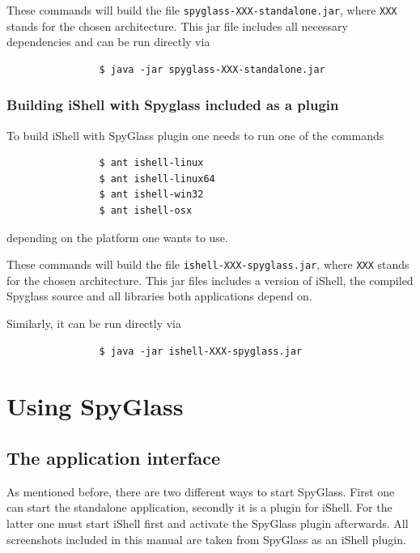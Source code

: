 			These commands will build the file \texttt{spyglass-XXX-standalone.jar}, where
			\texttt{XXX} stands for the chosen architecture.
			This jar file includes all necessary dependencies and can be run directly via

			\begin{verbatim}
			    $ java -jar spyglass-XXX-standalone.jar
			\end{verbatim}

		\subsubsection{Building iShell with Spyglass included as a plugin}

			To build iShell with SpyGlass plugin one needs to run one of the commands

			\begin{verbatim}
				$ ant ishell-linux
				$ ant ishell-linux64
				$ ant ishell-win32
				$ ant ishell-osx
			\end{verbatim}

			depending on the platform one wants to use.

			These commands will build the file \texttt{ishell-XXX-spyglass.jar}, where
			\texttt{XXX} stands for the chosen architecture.
			This jar files includes a version of iShell, the compiled Spyglass source
			and all libraries both applications depend on.

			Similarly, it can be run directly via

			\begin{verbatim}
				$ java -jar ishell-XXX-spyglass.jar
			\end{verbatim}

\section{Using SpyGlass}
	
	\subsection{The application interface}

		As mentioned before, there are two different ways to start SpyGlass. First one 
		can start the standalone application, secondly it is a plugin for iShell. For the 
		latter one must start iShell first and activate the SpyGlass plugin afterwards. 
		All screenshots included in this manual are taken from SpyGlass as an iShell 
		plugin.

